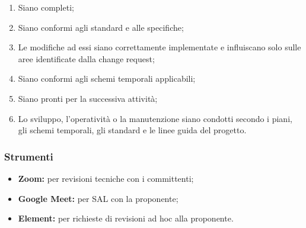 \begin{enumerate}
    \item Siano completi;
    \item Siano conformi agli standard e alle specifiche;
    \item Le modifiche ad essi siano correttamente implementate e influiscano solo sulle aree identificate dalla change request;
    \item Siano conformi agli schemi temporali applicabili;
    \item Siano pronti per la successiva attività;
    \item Lo sviluppo, l'operatività o la manutenzione siano condotti secondo i piani, gli schemi temporali, gli standard e le linee guida del progetto.
\end{enumerate}

\subsubsection{Strumenti}

\begin{itemize}
    \item \textbf{Zoom:} per revisioni tecniche con i committenti;
    \item \textbf{Google Meet:} per SAL con la proponente; 
    \item \textbf{Element:} per richieste di revisioni ad hoc alla proponente.
\end{itemize}